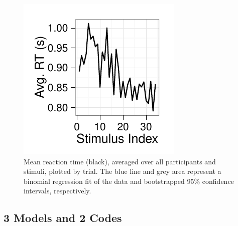 \documentclass[doc,12pt]{apa}        %
\begin{document}
\begin{figure}[tp]
	\includegraphics{f_all_mean_rt}
    \centering
	\caption{Mean reaction time (black), averaged over all participants and stimuli, plotted by trial.  The blue line and grey area represent a binomial regression fit of the data and bootstrapped 95\% confidence intervals, respectively.}
	\label{fig:meanrt}
\end{figure}

\subsection{3 Models and 2 Codes}
\label{sub:threemodels}
\end{document}
